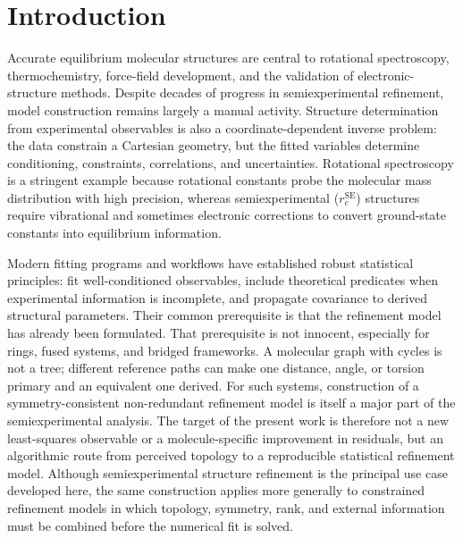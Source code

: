 \documentclass[aip,jcp,reprint,longbibliography,floatfix]{revtex4-2}
\begin{document}

\maketitle


\section{Introduction}

Accurate equilibrium molecular structures are central to rotational
spectroscopy, thermochemistry, force-field development, and the validation of
electronic-structure methods.\cite{Demaison2011EquilibriumStructures,PuzzariniStanton2023}
Despite decades of progress in semiexperimental refinement, model construction
remains largely a manual activity. Structure determination from experimental
observables is also a
coordinate-dependent inverse problem: the data constrain a Cartesian geometry,
but the fitted variables determine conditioning, constraints, correlations, and
uncertainties. Rotational spectroscopy is a stringent example because
rotational constants probe the molecular mass distribution with high precision,
whereas semiexperimental ($r_e^{\mathrm{SE}}$) structures require vibrational
and sometimes electronic corrections to convert ground-state constants into
equilibrium information.\cite{Costain1958,Pawlowski2002,Piccardo2015B3LYP,Penocchio2015B2PLYP}

Modern fitting programs and workflows\cite{Mendolicchio2017MSR,KisielPROSPE,Kanzow2025PCCP} 
have established robust statistical principles: fit well-conditioned
observables, include theoretical predicates when experimental information is
incomplete, and propagate covariance to derived structural
parameters.\cite{Bartell1975Predicate} Their common prerequisite is that the
refinement model has already been formulated. That prerequisite is not
innocent, especially for rings, fused systems, and bridged frameworks. A
molecular graph with cycles is not a tree; different reference paths can make
one distance, angle, or torsion primary and an equivalent one derived. For
such systems, construction of a symmetry-consistent non-redundant refinement
model is itself a major part of the semiexperimental analysis. The target of
the present work is therefore not a new least-squares observable or a
molecule-specific improvement in residuals, but an algorithmic route from
perceived topology to a reproducible statistical refinement model.
Although semiexperimental structure refinement is the principal use case
developed here, the same construction applies more generally to constrained
refinement models in which topology, symmetry, rank, and external information
must be combined before the numerical fit is solved.
\end{document}
